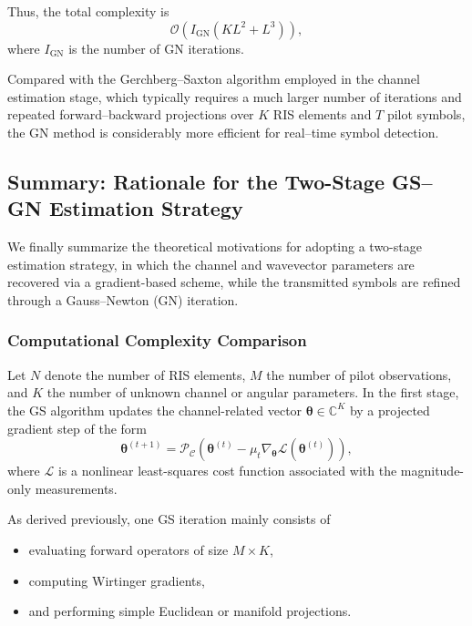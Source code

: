 \documentclass[journal]{IEEEtran}
\begin{document}
Thus, the total complexity is
%
\begin{equation}
\mathcal O\!\left(
I_{\mathrm{GN}}
\left(
KL^2+L^3
\right)
\right),
\end{equation}
%
where $I_{\mathrm{GN}}$ is the number of GN iterations.

Compared with the Gerchberg--Saxton algorithm employed in the channel estimation stage, which typically requires a much larger number of iterations and repeated forward--backward projections over $K$ RIS elements and $T$ pilot symbols, the GN method is considerably more efficient for real--time symbol detection.


\subsection{Summary: Rationale for the Two-Stage GS--GN Estimation Strategy}

We finally summarize the theoretical motivations for adopting a two-stage estimation strategy, in which the channel and wavevector parameters are recovered via a gradient-based scheme, while the transmitted symbols are refined through a Gauss--Newton (GN) iteration.

\subsubsection*{Computational Complexity Comparison}

Let $N$ denote the number of RIS elements, $M$ the number of pilot observations, and $K$ the number of unknown channel or angular parameters.  
In the first stage, the GS algorithm updates the channel-related vector $\boldsymbol{\theta}\in\mathbb{C}^{K}$ by a projected gradient step of the form
\begin{equation}
\boldsymbol{\theta}^{(t+1)}
=
\mathcal{P}_{\mathcal{C}}
\!\left(
\boldsymbol{\theta}^{(t)}
-
\mu_t
\nabla_{\boldsymbol{\theta}}
\mathcal{L}(\boldsymbol{\theta}^{(t)})
\right),
\end{equation}
where $\mathcal{L}$ is a nonlinear least-squares cost function associated with the magnitude-only measurements.

As derived previously, one GS iteration mainly consists of

\begin{itemize}
\item evaluating forward operators of size $M\times K$,
\item computing Wirtinger gradients,
\item and performing simple Euclidean or manifold projections.
\end{itemize}
\end{document}
